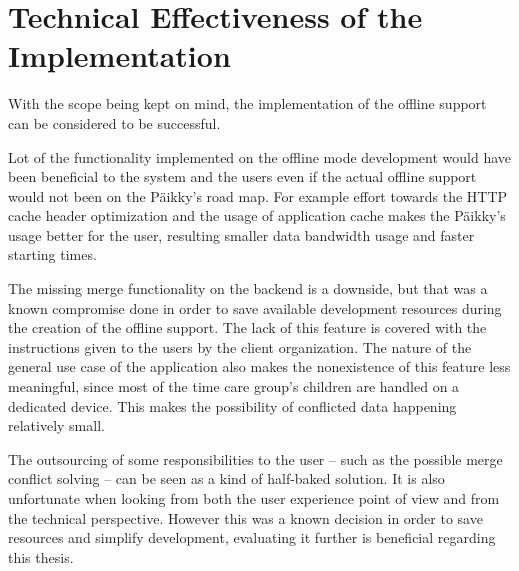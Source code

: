 \section{Technical Effectiveness of the Implementation}





With the scope being kept on mind, the implementation of the offline support can be considered to be successful. 

Lot of the functionality implemented on the offline mode development would have been beneficial to the system and the users even if the actual offline support would not been on the Päikky's road map. For example effort towards the HTTP cache header optimization and the usage of application cache makes the Päikky's usage better for the user, resulting smaller data bandwidth usage and faster starting times.

The missing merge functionality on the backend is a downside, but that was a known compromise done in order to save available development resources during the creation of the offline support. The lack of this feature is covered with the instructions given to the users by the client organization. The nature of the general use case of the application also makes the nonexistence of this feature less meaningful, since most of the time care group's children are handled on a dedicated device. This makes the possibility of conflicted data happening relatively small.

The outsourcing of some responsibilities to the user -- such as the possible merge conflict solving -- can be seen as a kind of half-baked solution. It is also unfortunate when looking from both the user experience point of view and from the technical perspective. However this was a known decision in order to save resources and simplify development, evaluating it further is beneficial regarding this thesis.

